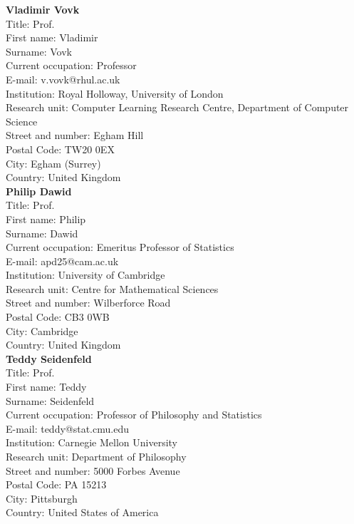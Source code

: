 \documentclass[11pt,dvipsnames,usenames,a4paper]{article}
\begin{document}
{\bf Vladimir Vovk}\\
Title: Prof.\\
First name: Vladimir\\
Surname:  Vovk\\
Current occupation: Professor\\
E-mail: v.vovk@rhul.ac.uk\\
Institution: Royal Holloway, University of London\\
Research unit: Computer Learning Research Centre, Department of Computer Science\\
Street and number: Egham Hill\\
Postal Code: TW20 0EX\\
City: Egham (Surrey)\\
Country: United Kingdom\\[-7pt]

{\bf Philip Dawid}\\
Title: Prof.\\
First name: Philip\\
Surname:  Dawid\\
Current occupation: Emeritus Professor of Statistics\\
E-mail:  apd25@cam.ac.uk\\
Institution: University of Cambridge\\
Research unit: Centre for Mathematical Sciences\\
Street and number: Wilberforce Road\\
Postal Code: CB3 0WB\\
City: Cambridge\\
Country: United Kingdom\\[-7pt]

{\bf Teddy Seidenfeld}\\
Title: Prof.\\
First name: Teddy\\
Surname: Seidenfeld \\
Current occupation: Professor of Philosophy and Statistics\\
E-mail: teddy@stat.cmu.edu\\
Institution: Carnegie Mellon University\\
Research unit: Department of Philosophy\\
Street and number: 5000 Forbes Avenue\\
Postal Code: PA 15213\\
City:  Pittsburgh\\
Country: United States of America\\[-7pt]
\end{document}
